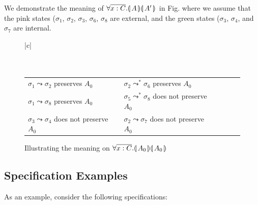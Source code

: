 {We demonstrate the meaning of ${\forall {\overline {x:C}}.{\llparenthesis}\, A \,{\rrparenthesis}{\llparenthesis}\, A' \,{\rrparenthesis}}$ in Fig. where we assume that the pink states (\ie   ${\sigma_1}$, 
 ${\sigma_2}$,  ${\sigma_3}$,  ${\sigma_6}$,  ${\sigma_8}$ are external, and the green states (\ie   ${\sigma_3}$, 
 ${\sigma_4}$,  and ${\sigma_7}$ are internal.}
 
 \begin{figure}[htb]
\begin{tabular}{|c|}
\hline \\
\\
\hline
\\
\begin{tabular}{lclclcl} 
$ {\sigma_1} \leadsto  \sigma_2 $ preserves $A_0$ & &
$ {\sigma_2} \leadsto^*  \sigma_6 $ preserves $A_0$ \\
$ {\sigma_1} \leadsto  \sigma_8 $ preserves $A_0$ & &
$ {\sigma_5} \leadsto^* \sigma_8 $ does not preserve $A_0$\\
$ {\sigma_3} \leadsto  \sigma_4 $ does not preserve $A_0$ & &
$ {\sigma_2} \leadsto  \sigma_7 $ does not preserve $A_0$
\\
\hline
\end{tabular}
\end{tabular}
   \caption{Illustrating  the meaning on ${\forall {\overline {x:C}}.{\llparenthesis}\, A_0 \,{\rrparenthesis}{\llparenthesis}\, A_0 \,{\rrparenthesis}}$    }
   \label{fig:TwoStateSemantics}
 \end{figure}
 
\subsection{Specification Examples}
\noindent
As an example, consider the following    specifications:

